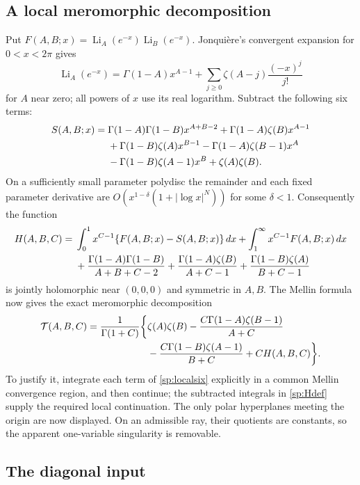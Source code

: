\documentclass[11pt,a4paper]{article}
\theoremstyle{definition}
\theoremstyle{remark}
\numberwithin{equation}{section}
\begin{document}
\subsection{A local meromorphic decomposition}

Put $F(A,B;x)=\operatorname{Li}_A(e^{-x})
                         \operatorname{Li}_B(e^{-x})$.
Jonqui\`ere's convergent expansion for $0<x<2\pi$ gives
\[
 \operatorname{Li}_A(e^{-x})
  =\Gamma(1-A)x^{A-1}
    +\sum_{j\geq0}\zeta(A-j)\frac{(-x)^j}{j!}
\]
for $A$ near zero; all powers of $x$ use its real logarithm.
Subtract the following six terms:
\begin{align}\label{sp:localsix}
 S(A,B;x)={}&\Gamma(1-A)\Gamma(1-B)x^{A+B-2}
   +\Gamma(1-A)\zeta(B)x^{A-1}\notag\\
 &+\Gamma(1-B)\zeta(A)x^{B-1}
   -\Gamma(1-A)\zeta(B-1)x^A\notag\\
 &-\Gamma(1-B)\zeta(A-1)x^B+\zeta(A)\zeta(B).
\end{align}
On a sufficiently small parameter polydisc the remainder and each
fixed parameter derivative are $O(x^{1-\delta}(1+|\log x|^N))$ for
some $\delta<1$.  Consequently the function
\begin{align}\label{sp:Hdef}
 H(A,B,C)={}&\int_0^1 x^{C-1}\{F(A,B;x)-S(A,B;x)\}\,dx
            +\int_1^\infty x^{C-1}F(A,B;x)\,dx\notag\\
 &+\frac{\Gamma(1-A)\Gamma(1-B)}{A+B+C-2}
   +\frac{\Gamma(1-A)\zeta(B)}{A+C-1}
   +\frac{\Gamma(1-B)\zeta(A)}{B+C-1}
\end{align}
is jointly holomorphic near $(0,0,0)$ and symmetric in $A,B$.
The Mellin formula now gives the exact meromorphic decomposition
\begin{align}\label{sp:meromorphicH}
 \mathcal T(A,B,C)=\frac1{\Gamma(1+C)}\biggl\{
  &\zeta(A)\zeta(B)
   -\frac{C\Gamma(1-A)\zeta(B-1)}{A+C}\notag\\
  &-\frac{C\Gamma(1-B)\zeta(A-1)}{B+C}
   +C H(A,B,C)\biggr\}.
\end{align}
To justify it, integrate each term of \eqref{sp:localsix} explicitly
in a common Mellin convergence region, and then continue; the
subtracted integrals in \eqref{sp:Hdef} supply the required local
continuation.  The only polar hyperplanes meeting the origin are now
displayed.  On an admissible ray, their quotients are constants, so
the apparent one-variable singularity is removable.

\subsection{The diagonal input}
\end{document}
